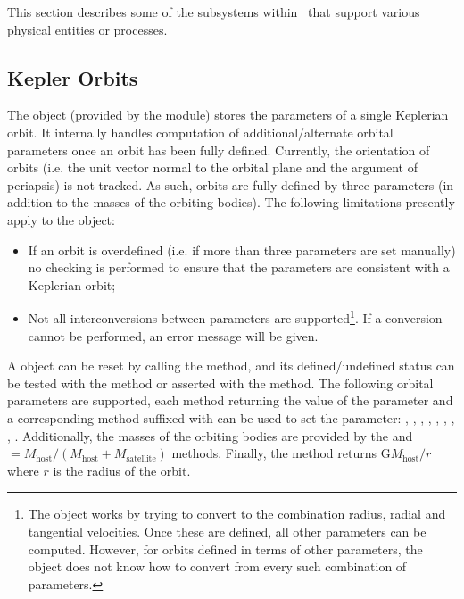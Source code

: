 This section describes some of the subsystems within \glc\ that support various physical entities or processes.

\subsection{Kepler Orbits}\label{sec:KeplerOrbits}

The  object (provided by the \href{https://github.com/galacticusorg/galacticus/releases/download/bleeding-edge/Galacticus_Source.pdf#source.objects_kepler_orbits_F90:kepler_orbits}{} module) stores the parameters of a single Keplerian orbit. It internally handles computation of additional/alternate orbital parameters once an orbit has been fully defined. Currently, the orientation of orbits (i.e. the unit vector normal to the orbital plane and the argument of periapsis) is not tracked. As such, orbits are fully defined by three parameters (in addition to the masses of the orbiting bodies). The following limitations presently apply to the  object:
\begin{itemize}
 \item If an orbit is overdefined (i.e. if more than three parameters are set manually) no checking is performed to ensure that the parameters are consistent with a Keplerian orbit;
 \item Not all interconversions between parameters are supported\footnote{The  object works by trying to convert to the combination radius, radial and tangential velocities. Once these are defined, all other parameters can be computed. However, for orbits defined in terms of other parameters, the  object does not know how to convert from every such combination of parameters.}. If a conversion cannot be performed, an error message will be given. 
\end{itemize}
A  object can be reset by calling the  method, and its defined/undefined status can be tested with the  method or asserted with the  method. The following orbital parameters are supported, each method returning the value of the parameter and a corresponding method suffixed with  can be used to set the parameter: , , , , , , , , . Additionally, the masses of the orbiting bodies are provided by the  and $=M_\mathrm{host}/(M_\mathrm{host}+M_\mathrm{satellite})$ methods. Finally, the  method returns $\mathrm{G}M_\mathrm{host}/r$ where $r$ is the radius of the orbit.


